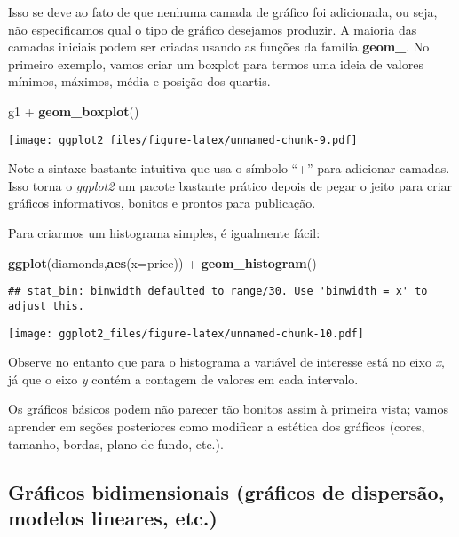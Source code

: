 \documentclass[]{article}
\newenvironment{Shaded}{\begin{snugshade}}{\end{snugshade}}
\newcommand{\KeywordTok}[1]{\textcolor[rgb]{0.13,0.29,0.53}{\textbf{{#1}}}}
\newcommand{\DataTypeTok}[1]{\textcolor[rgb]{0.13,0.29,0.53}{{#1}}}
\newcommand{\StringTok}[1]{\textcolor[rgb]{0.31,0.60,0.02}{{#1}}}
\newcommand{\NormalTok}[1]{{#1}}
\begin{document}
Isso se deve ao fato de que nenhuma camada de gráfico foi adicionada, ou
seja, não especificamos qual o tipo de gráfico desejamos produzir. A
maioria das camadas iniciais podem ser criadas usando as funções da
família \textbf{geom\_}. No primeiro exemplo, vamos criar um boxplot
para termos uma ideia de valores mínimos, máximos, média e posição dos
quartis.

\begin{Shaded}
\begin{Highlighting}[]
\NormalTok{g1 +}\StringTok{ }\KeywordTok{geom_boxplot}\NormalTok{()}
\end{Highlighting}
\end{Shaded}

\texttt{[image: ggplot2\_files/figure-latex/unnamed-chunk-9.pdf]}

Note a sintaxe bastante intuitiva que usa o símbolo ``+'' para adicionar
camadas. Isso torna o \emph{ggplot2} um pacote bastante prático
\sout{depois de pegar o jeito} para criar gráficos informativos, bonitos
e prontos para publicação.

Para criarmos um histograma simples, é igualmente fácil:

\begin{Shaded}
\begin{Highlighting}[]
\KeywordTok{ggplot}\NormalTok{(diamonds,}\KeywordTok{aes}\NormalTok{(}\DataTypeTok{x=}\NormalTok{price)) +}\StringTok{ }\KeywordTok{geom_histogram}\NormalTok{()}
\end{Highlighting}
\end{Shaded}

\begin{verbatim}
## stat_bin: binwidth defaulted to range/30. Use 'binwidth = x' to adjust this.
\end{verbatim}

\texttt{[image: ggplot2\_files/figure-latex/unnamed-chunk-10.pdf]}

Observe no entanto que para o histograma a variável de interesse está no
eixo \emph{x}, já que o eixo \emph{y} contém a contagem de valores em
cada intervalo.

Os gráficos básicos podem não parecer tão bonitos assim à primeira
vista; vamos aprender em seções posteriores como modificar a estética
dos gráficos (cores, tamanho, bordas, plano de fundo, etc.).

\subsection{Gráficos bidimensionais (gráficos de dispersão, modelos
lineares,
etc.)}\label{graficos-bidimensionais-graficos-de-dispersao-modelos-lineares-etc.}
\end{document}
